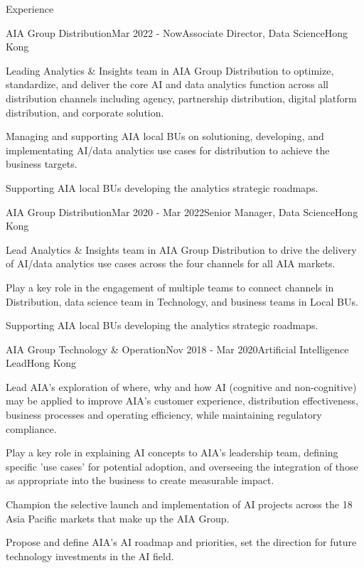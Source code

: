 \documentclass{resume} %
\begin{document}
\begin{rSection}{Experience}

\begin{rSubsection}{AIA Group Distribution}{Mar 2022 - Now}{Associate Director, Data Science}{Hong Kong}
\item Leading Analytics \& Insights team in AIA Group Distribution to optimize, standardize, and deliver the core AI and data analytics function across all distribution channels including agency, partnership distribution, digital platform distribution, and corporate solution.
\item Managing and supporting AIA local BUs on solutioning, developing, and implementating AI/data analytics use cases for distribution to achieve the business targets.
\item Supporting AIA local BUs developing the analytics strategic roadmaps.
\end{rSubsection}


\begin{rSubsection}{AIA Group Distribution}{Mar 2020 - Mar 2022}{Senior Manager, Data Science}{Hong Kong}
\item Lead Analytics \& Insights team in AIA Group Distribution to drive the delivery of AI/data analytics use cases across the four channels for all AIA markets.
\item Play a key role in the engagement of multiple teams to connect channels in Distribution, data science team in Technology, and business teams in Local BUs.
\item Supporting AIA local BUs developing the analytics strategic roadmaps.
\end{rSubsection}


\begin{rSubsection}{AIA Group Technology \& Operation}{Nov 2018 - Mar 2020}{Artificial Intelligence Lead}{Hong Kong}
\item Lead AIA's exploration of where, why and how AI (cognitive and non-cognitive) may be applied to improve AIA's customer experience, distribution effectiveness, business processes and operating efficiency, while maintaining regulatory compliance.
\item Play a key role in explaining AI concepts to AIA's leadership team, defining specific 'use cases' for potential adoption, and overseeing the integration of those as appropriate into the business to create measurable impact.
\item Champion the selective launch and implementation of AI projects across the 18 Asia Pacific markets that make up the AIA Group.
\item Propose and define AIA's AI roadmap and priorities, set the direction for future technology investments in the AI field.
\end{rSubsection}


\end{rSection}
\end{document}
